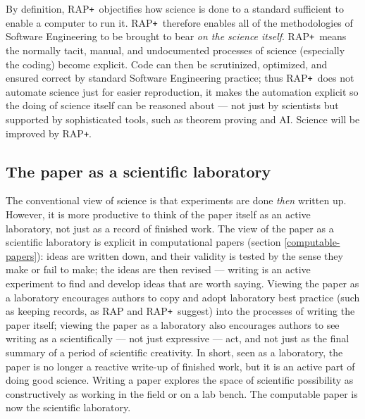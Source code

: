 \documentclass{comjnl}
\def\RAPstar{RAP{\tt +}}
\begin{document}
By definition, \RAPstar\ objectifies how science is done to a standard sufficient to enable a computer to run it. \RAPstar\ therefore enables all of the methodologies of Software Engineering to be brought to bear \emph{on the science itself}. \RAPstar\ means the normally tacit, manual, and undocumented processes of science (especially the coding) become explicit. Code can then be scrutinized, optimized, and ensured correct by standard Software Engineering practice; thus \RAPstar\ does not automate science just for easier reproduction, it makes the automation explicit so the doing of science itself can be reasoned about --- not just by scientists but supported by sophisticated tools, such as theorem proving and AI\@. Science will be improved by \RAPstar.

\subsection{The paper as a scientific laboratory}\label{paper-as-lab}
The conventional view of science is that experiments are done \emph{then\/} written up. 
However, it is more productive to think of the paper itself as an active laboratory, not just as a record of finished work. The view of the paper as a scientific laboratory is explicit in computational papers (section \ref{computable-papers}): ideas are written down, and their validity is tested by the sense they make or fail to make; the ideas are then revised --- writing is an active experiment to find and develop ideas that are worth saying. Viewing the paper as a laboratory encourages authors to copy and adopt laboratory best practice (such as keeping records, as RAP and \RAPstar\ suggest) into the processes of writing the paper itself; viewing the paper as a laboratory also encourages authors to see writing as a scientifically --- not just expressive --- act, and not just as the final summary of a period of scientific creativity. In short, seen as a laboratory, the paper is no longer a reactive write-up of finished work, but it is an active part of doing good science. Writing a paper explores the space of scientific possibility as constructively as working in the field or on a lab bench. The computable paper is now the scientific laboratory.
\end{document}
